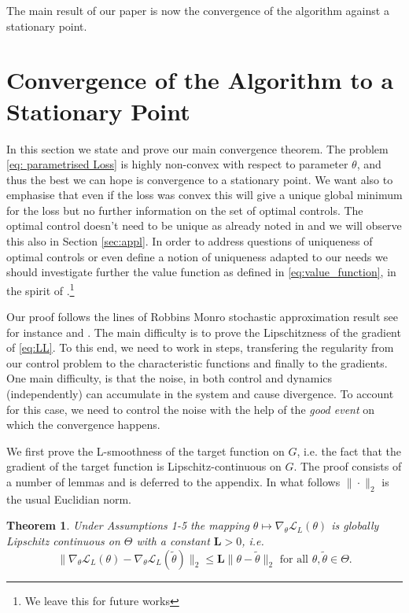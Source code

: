 \documentclass[reqno, 11pt]{amsart}%
\newtheorem{theorem}{Theorem}
\theoremstyle{definition}
\begin{document}
The main result of our paper is now the convergence of the algorithm against a stationary point. 

\section{Convergence of the Algorithm to a Stationary Point}
In this section we state and prove our main convergence theorem. The problem \eqref{eq: parametrised Loss} is highly non-convex with respect to parameter $\theta$, and thus the best we can hope is convergence to a stationary point. We want also to emphasise that even if the loss was convex this will give a unique global minimum for the loss but no further information on the set of optimal controls. The optimal control doesn't need to be unique as  already noted in \cite[Chapter 7.4, 7.5]{Bellemare2023DistributionalRL} and we will observe this also in Section \ref{sec:appl}. In order to address questions of uniqueness of optimal controls or even define a notion of uniqueness adapted to our needs we should investigate further the value function as defined in \eqref{eq:value_function}, in the spirit of  \cite{bauerle2025distributionalbellmanequation}.\footnote{We leave this for future works} 

Our proof follows the lines of Robbins Monro stochastic approximation result see for instance \cite{Borkar2025StochasticApproxRL} and \cite[Chapter 5 and Exercise 5.30]{Bach2024LearningTheory}. The main difficulty is to prove the Lipschitzness of the gradient of \eqref{eq:LL}. To this end, we need to work in steps, transfering the regularity from our control problem to the characteristic functions and finally to the gradients. One main difficulty, is that the noise, in both control and dynamics (independently) can accumulate in the system and cause divergence. To account for this case, we need to control the noise with the help of the \emph{good event} on which  the convergence happens.       

We first prove the L-smoothness of the target function on $G$, i.e. the fact that the gradient of the target function is Lipschitz-continuous on $G$. The proof consists of a number of lemmas and is deferred to the appendix. In what follows $\|\cdot\|_2$ is the usual Euclidian norm.

\begin{theorem}\label{lem:Lipschitz_gradient}
Under Assumptions 1-5
the mapping $\theta \mapsto \nabla_\theta \mathcal{L}_{L}(\theta)$  is   globally Lipschitz continuous on $\Theta$ with a constant $\mathbf{L}>0$, i.e.
$$\|  \nabla_\theta \mathcal{L}_L(\theta) -  \nabla_\theta \mathcal{L}_L(\tilde\theta)\|_2 \le \mathbf{L} \|\theta-\tilde\theta\|_2 \mbox{ for all }  \theta,\tilde\theta\in\Theta.$$
\end{theorem}
\end{document}
